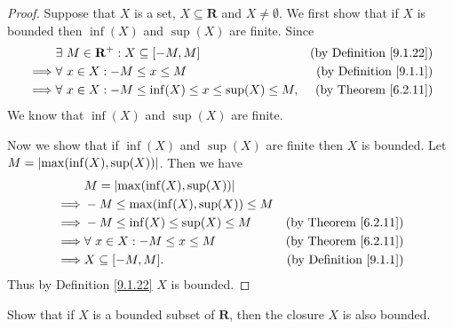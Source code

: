 \begin{proof}
    Suppose that \(X\) is a set, \(X \subseteq \mathbf{R}\) and \(X \neq \emptyset\).
    We first show that if \(X\) is bounded then \(\inf(X)\) and \(\sup(X)\) are finite.
    Since
    \begin{align*}
                 & \exists\ M \in \mathbf{R}^+ : X \subseteq [-M, M]              & \text{(by Definition \ref{9.1.22})} \\
        \implies & \forall\ x \in X : -M \leq x \leq M                            & \text{(by Definition \ref{9.1.1})}  \\
        \implies & \forall\ x \in X : -M \leq \inf(X) \leq x \leq \sup(X) \leq M, & \text{(by Theorem \ref{6.2.11})}
    \end{align*}
    We know that \(\inf(X)\) and \(\sup(X)\) are finite.

    Now we show that if \(\inf(X)\) and \(\sup(X)\) are finite then \(X\) is bounded.
    Let \(M = \abs*{\max(\inf(X), \sup(X))}\).
    Then we have
    \begin{align*}
                 & M = \abs*{\max(\inf(X), \sup(X))}                                          \\
        \implies & -M \leq \max(\inf(X), \sup(X)) \leq M                                      \\
        \implies & -M \leq \inf(X) \leq \sup(X) \leq M   & \text{(by Theorem \ref{6.2.11})}   \\
        \implies & \forall\ x \in X : -M \leq x \leq M   & \text{(by Theorem \ref{6.2.11})}   \\
        \implies & X \subseteq [-M, M].                  & \text{(by Definition \ref{9.1.1})}
    \end{align*}
    Thus by Definition \ref{9.1.22} \(X\) is bounded.
\end{proof}

\begin{exercise}\label{ex 9.1.11}
    Show that if \(X\) is a bounded subset of \(\mathbf{R}\), then the closure \(X\) is also bounded.
\end{exercise}

